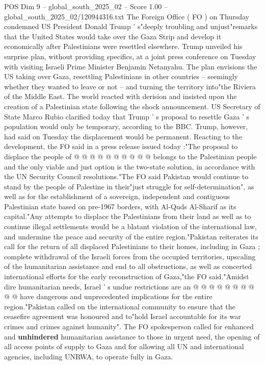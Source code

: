 \begin{textsample}{POS Dim 9 – global\_south\_2025\_02 – Score 1.00 – global\_south\_2025\_02/120944316.txt}  \label{ex:f9_pos_400}
The Foreign Office ( FO ) on Thursday condemned US President Donald Trump ' s"deeply troubling and unjust"remarks that the United States would take over the Gaza Strip and develop it economically after Palestinians were resettled elsewhere.
Trump unveiled his surprise plan, without providing specifics, at a joint press conference on Tuesday with visiting Israeli Prime Minister Benjamin Netanyahu.
The plan envisions the US taking over Gaza, resettling Palestinians in other countries -- seemingly whether they wanted to leave or not -- and turning the territory into"the Riviera of the Middle East.
The world reacted with derision and insisted upon the creation of a Palestinian state following the shock announcement.
US Secretary of State Marco Rubio clarified today that Trump ' s proposal to resettle Gaza ' s population would only be temporary, according to the BBC.
Trump, however, had said on Tuesday the displacement would be permanent.
Reacting to the development, the FO said in a press release issued today :"The proposal to displace the people of @ @ @ @ @ @ @ @ @ @ belongs to the Palestinian people and the only viable and just option is the two-state solution, in accordance with the UN Security Council resolutions."The FO said Pakistan would continue to stand by the people of Palestine in their"just struggle for self-determination", as well as for the establishment of a sovereign, independent and contiguous Palestinian state based on pre-1967 borders, with Al-Quds Al-Sharif as its capital."Any attempts to displace the Palestinians from their land as well as to continue illegal settlements would be a blatant violation of the international law, and undermine the peace and security of the entire region."Pakistan reiterates its call for the return of all displaced Palestinians to their homes, including in Gaza ; complete withdrawal of the Israeli forces from the occupied territories, upscaling of the humanitarian assistance and end to all obstructions, as well as concerted international efforts for the early reconstruction of Gaza,"the FO said."Amidst dire humanitarian needs, Israel ' s undue restrictions are an @ @ @ @ @ @ @ @ @ @ have dangerous and unprecedented implications for the entire region."Pakistan called on the international community to ensure that the ceasefire agreement was honoured and to"hold Israel accountable for its war crimes and crimes against humanity".
The FO spokesperson called for enhanced and \textbf{unhindered} humanitarian assistance to those in urgent need, the opening of all access points of supply to Gaza and for allowing all UN and international agencies, including UNRWA, to operate fully in Gaza.

\end{textsample}
